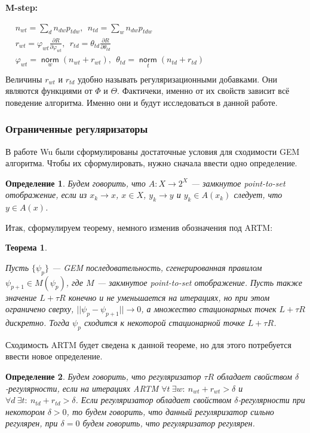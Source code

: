 \documentclass[12pt]{article}
\newtheorem{definition}{Определение}[section]
\newtheorem{theorem}{Теорема}
\renewcommand{\phi}{\varphi}
\newcommand{\norm}{\mathop{\mathsf{norm}}\limits}
\begin{document}
\textbf{M-step:}

$
\begin{aligned}    
& n_{wt} = \sum\limits_{d} n_{dw} p_{tdw},~~n_{td} = \sum\limits_{w} n_{dw} p_{tdw}\\    
& r_{wt} =  \phi_{wt}\frac{\partial R}{\partial\phi_{wt}},~~ r_{td} =  \theta_{td}\frac{\partial R}{\partial\theta_{td}}\\
& \phi_{wt}  = \norm_w \left(n_{wt} + r_{wt} \right),~~\theta_{td} = \norm_t  \left(n_{td} + r_{td}\right)\\
\end{aligned}
$\medskip\\
Величины $r_{wt}$ и $r_{td}$ удобно называть регуляризационными добавками. Они являются функциями от $\Phi$ и $\Theta$. Фактичеки, именно от их свойств зависит всё поведение алгоритма. Именно они и будут исследоваться в данной работе.


	\subsubsection{Ограниченные регуляризаторы}
	 В работе Wu \cite{wuem} были сформулированы достаточные условия для сходимости GEM алгоритма. Чтобы их сформулировать, нужно сначала ввести одно определение.
	\begin{definition}
	Будем говорить, что $A\colon X \to 2^X$ --- замкнутое point-to-set отображение, если из $x_k \to x$, $x \in X$, $y_k \to y$ и $y_k \in A(x_k)$ следует, что $y \in A(x)$.
	\end{definition}

	Итак, сформулируем теорему, немного изменив обозначения под ARTM:
	\begin{theorem} \label{theorem_wu} 

	Пусть $\{\psi_p\}$ --- GEM последовательность, сгенерированная правилом $\psi_{p+1} \in M(\psi_p)$, где $M$ --- закмнутое point-to-set отображение. Пусть также значение $L + \tau R$ конечно и не уменьшается на итерациях, но при этом ограничено сверху, $|| \psi_p - \psi_{p+1}|| \to 0$, а множество стационарных точек $L + \tau R$ дискретно. Тогда $\psi_p$ сходится к некоторой стационарной точке $L + \tau R$.
	\end{theorem}

	Сходимость ARTM будет сведена к данной теореме, но для этого потребуется ввести новое определение.
	\begin{definition}
	\label{strongreg}
	Будем говорить, что регуляризатор $\tau R$ обладает свойством $\delta$-регулярности, если на итерациях ARTM $\forall t~\exists w \colon~n_{wt} + r_{wt} > \delta$ и $\forall d~\exists t \colon~n_{td} + r_{td} > \delta$. Если регуляризатор  обладает свойством $\delta$-регулярности при некотором $\delta > 0$, то будем говорить, что данный регуляризатор сильно регулярен, при $\delta=0$ будем говорить, что регуляризатор регулярен.
	\end{definition}
\end{document}
